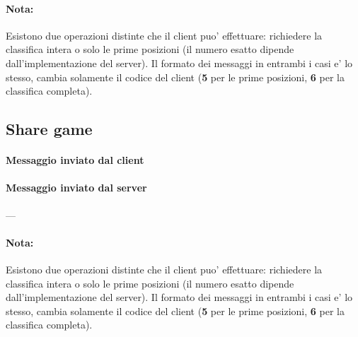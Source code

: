\paragraph{Nota:} Esistono due operazioni distinte che il client puo' effettuare: richiedere la classifica intera o solo le prime posizioni (il numero esatto dipende dall'implementazione del server).
Il formato dei messaggi in entrambi i casi e' lo stesso, cambia solamente il codice del client (\textbf{5} per le prime posizioni, \textbf{6} per la classifica completa).

\subsection{Share game}

\paragraph{Messaggio inviato dal client}

\begin{lrbox}{\asciiart}
	\begin{varwidth}{\maxdimen}
		\noindent
	\end{varwidth}
\end{lrbox}%

\begin{center}
	\begin{figure}[h]
		\makebox[\textwidth]{\showasciiart{40ex}}
	\end{figure}
\end{center}

\paragraph{Messaggio inviato dal server}

---

\paragraph{Nota:} Esistono due operazioni distinte che il client puo' effettuare: richiedere la classifica intera o solo le prime posizioni (il numero esatto dipende dall'implementazione del server).
Il formato dei messaggi in entrambi i casi e' lo stesso, cambia solamente il codice del client (\textbf{5} per le prime posizioni, \textbf{6} per la classifica completa).


